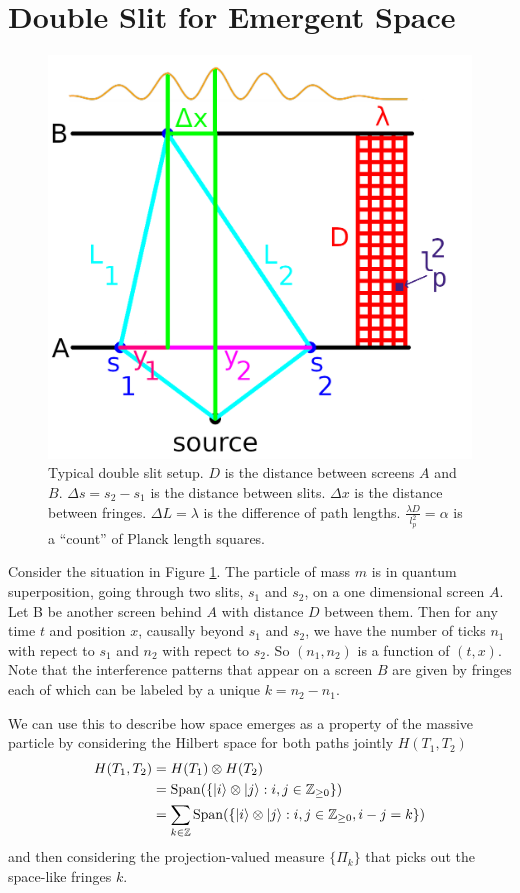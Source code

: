 \documentclass[12pt,a4paper]{article}
\begin{document}
\section{Double Slit for Emergent Space}


\begin{figure}[h!]
\centering
\includegraphics[scale=0.5]{double_slit.png}
\caption{Typical double slit setup.  $D$ is the distance between screens $A$ and $B$. $\Delta s = s_2 - s_1$ is the distance between slits.  $\Delta x$ is the distance between fringes. $\Delta L = \lambda$ is the difference of path lengths.  $\frac{\lambda D}{l_p^2} = \alpha$ is a ``count'' of Planck length squares.}
\label{screen}
\end{figure}


Consider the situation in Figure \ref{screen}.  The particle of mass $m$ is in quantum superposition, going through two slits, $s_1$ and $s_2$, on a one dimensional screen $A$. Let B be another screen behind $A$ with distance $D$ between them. Then for any time $t$ and position $x$, causally beyond $s_1$ and $s_2$, we have the number of ticks $n_1$ with repect to $s_1$ and $n_2$ with repect to $s_2$. So $(n_1,n_2)$ is a function of $(t,x)$. Note that the interference patterns that appear on a screen $B$ are given by fringes each of which can be labeled by a unique $k = n_2 - n_1$.

We can use this to describe how space emerges as a property of the massive particle by considering the Hilbert space for both paths jointly $H(T_1,T_2)$
\[
\begin{split}
  H(T_1,T_2) &= H(T_1) \otimes H(T_2) \\
  & = \mathrm{Span}(\{\ket{i} \otimes \ket{j}: i,j \in \mathbb{Z}_{\ge 0}\}) \\
  & = \sum_{k \in \mathbb{Z}} \mathrm{Span}(\{\ket{i} \otimes \ket{j} : i,j \in \mathbb{Z}_{\ge 0}, i-j = k\}) \\
\end{split}
\]
and then considering the projection-valued measure $\{\Pi_k\}$ that picks out the space-like fringes $k$.
\end{document}
